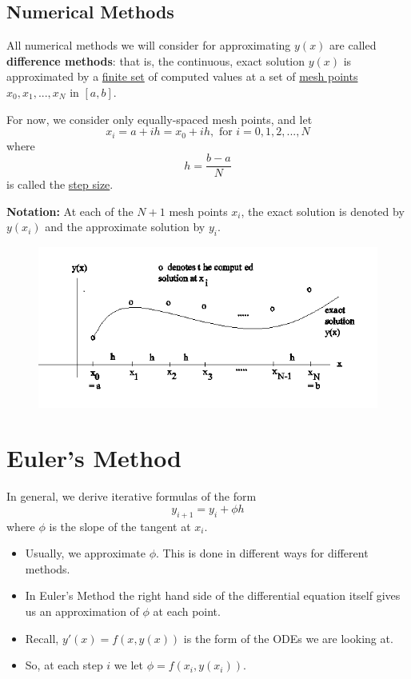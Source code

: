 \documentclass [titlepage,12pt,letter] {article}
\begin{document}
\subsection{Numerical Methods}

All numerical methods we will consider for approximating $y(x)$ are called {\bf difference methods}:  that is, the continuous, exact solution $y(x)$ is approximated by a \underline{finite set} of computed values at a set of \underline{mesh points} $x_0,x_1,...,x_N$  in $[a,b]$.

For now, we consider only equally-spaced mesh points, and let
\[
x_i=a+ih=x_0+ih, \text{ for } i=0,1,2,...,N
\]
where
\[
h=\frac{b-a}{N}					 
\]
is called the \underline{step size}.

{\bf Notation:} At each of the $N+1$ mesh points $x_i$, the exact solution is denoted by $y(x_i)$ and the approximate solution by $y_i$.

\begin{figure}[h] 
  \centering
  \includegraphics[scale=0.7]{solving_odes}
  \label{fig:solving_odes}
\end{figure}

\section{Euler's Method}

In general, we derive iterative formulas of the form
\[ y_{i+1}=y_i + \phi h \]
where $\phi$ is the slope of the tangent at $x_i$.
\begin{itemize}
\item{Usually, we approximate $\phi$. This is done in different ways for different methods.}
\item{In Euler's Method the right hand side of the differential equation itself gives us an approximation of $\phi$ at each point.}
\item{Recall, $y'(x)=f(x,y(x))$ is the form of the ODEs we are looking at.}
\item{So, at each step $i$ we let $\phi = f(x_i,y(x_i))$.}
\end{itemize}
\end{document}
